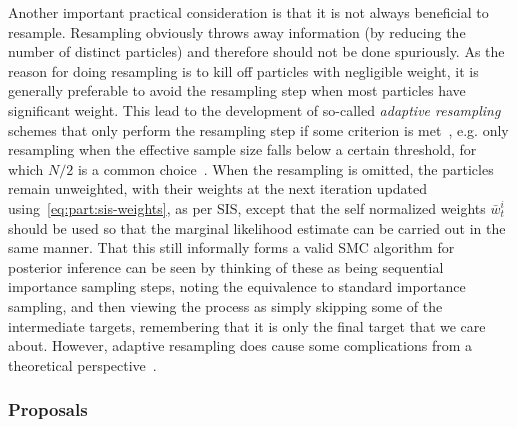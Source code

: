 Another important practical consideration is that it is not always beneficial to resample.  Resampling
obviously throws away information (by reducing the number of distinct particles)
and therefore should not be done spuriously.  As the reason for doing
resampling is to kill off particles with negligible weight, it is generally preferable to avoid the resampling step
when most particles have significant weight.  This lead to the development of so-called \emph{adaptive resampling}
schemes that only perform the resampling step if some criterion is met~\citep{liu1995blind,del2012adaptive}, e.g. 
only resampling when the effective sample size falls below a certain threshold,
for which $N/2$ is a common choice~\cite{doucet2009tutorial}.
When the resampling is omitted, the particles remain unweighted, with their weights at the next iteration updated
using~\eqref{eq:part:sis-weights}, as per SIS, except that the self normalized weights $\bar{w}_t^i$ should be used so that the
marginal likelihood estimate can be carried out in the same manner.
That this still informally forms a valid SMC algorithm for posterior inference can be seen by thinking of these as being sequential importance
sampling steps, noting the equivalence to standard importance sampling, and then viewing the process as simply
skipping some of the intermediate targets, remembering that it is only the final target that we care about.
However, adaptive resampling does cause some complications from a theoretical perspective~\citep{del2012adaptive}.

\subsubsection{Proposals}
\label{sec:part:smc:prat:opt}

